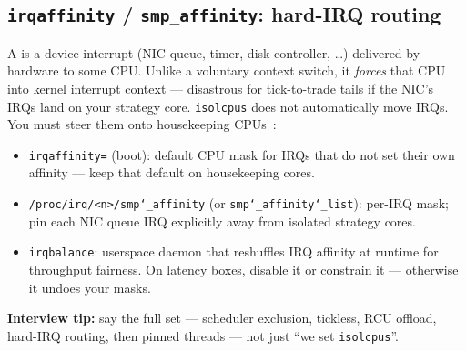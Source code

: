 \subsection{\texttt{irqaffinity} / \texttt{smp\_affinity}: hard-IRQ routing}
\label{subsec:irq-affinity}
A  is a device interrupt (NIC queue, timer, disk controller, \ldots) 
delivered by hardware to some CPU. Unlike a voluntary context switch, it 
\emph{forces} that CPU into kernel interrupt context --- disastrous for 
tick-to-trade tails if the NIC's IRQs land on your strategy core.
\newline
\texttt{isolcpus} does not automatically move IRQs. You must steer them onto 
housekeeping CPUs~\cite{kernel-irq-affinity}:
\begin{itemize}
    \item \texttt{irqaffinity=} (boot): default CPU mask for IRQs that do not set 
          their own affinity --- keep that default on housekeeping cores.
    \item \texttt{/proc/irq/<n>/smp\char`_affinity} (or 
          \texttt{smp\char`_affinity\char`_list}): per-IRQ mask; pin each NIC 
          queue IRQ explicitly away from isolated strategy cores.
    \item \texttt{irqbalance}: userspace daemon that reshuffles IRQ affinity at 
          runtime for throughput fairness. On latency boxes, disable it or 
          constrain it --- otherwise it undoes your masks.
\end{itemize}
\par\noindent\textbf{Interview tip:} say the full set --- scheduler exclusion, 
tickless, RCU offload, hard-IRQ routing, then pinned threads --- not just 
``we set \texttt{isolcpus}''.

